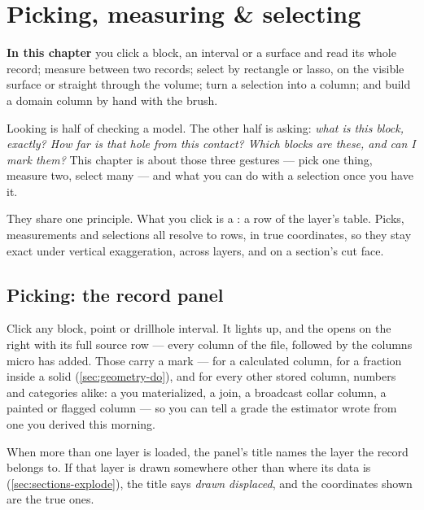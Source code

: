 \chapter{Picking, measuring \& selecting}\label{ch:picking}
\begin{goals}
\textbf{In this chapter} you click a block, an interval or a surface and read its whole record; measure between two records; select by rectangle or lasso, on the visible surface or straight through the volume; turn a selection into a column; and build a domain column by hand with the brush.
\end{goals}

Looking is half of checking a model. The other half is asking: \emph{what is this block, exactly? How far is that hole from this contact? Which blocks are these, and can I mark them?} This chapter is about those three gestures — pick one thing, measure two, select many — and what you can do with a selection once you have it.

They share one principle. What you click is a : a row of the layer's table. Picks, measurements and selections all resolve to rows, in true coordinates, so they stay exact under vertical exaggeration, across layers, and on a section's cut face.

\section{Picking: the record panel}\label{sec:picking-record}
Click any block, point or drillhole interval. It lights up, and the  opens on the right with its full source row — every column of the file, followed by the columns micro has added. Those carry a mark —  for a calculated column, \code{\%} for a fraction inside a solid (\cref{sec:geometry-do}), and  for every other stored column, numbers and categories alike: a  you materialized, a join, a broadcast collar column, a painted or flagged column — so you can tell a grade the estimator wrote from one you derived this morning.

When more than one layer is loaded, the panel's title names the layer the record belongs to. If that layer is drawn somewhere other than where its data is (\cref{sec:sections-explode}), the title says \emph{drawn displaced}, and the coordinates shown are the true ones.


